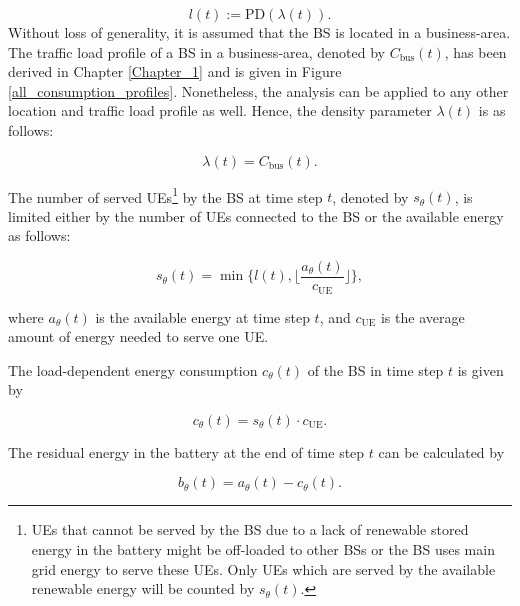 \begin{equation}
\label{PPP1}
l(t):=\mathrm{PD}(\lambda(t)).
\end{equation}
Without loss of generality, it is assumed that the BS is located in a business-area. The traffic load profile of a BS in a business-area, denoted by $C_{\mathrm{bus}}(t)$, has been derived in Chapter \ref{Chapter_1} and is given in Figure \ref{all_consumption_profiles}. Nonetheless, the analysis can be applied to any other location and traffic load profile as well.
 Hence, the density parameter $\lambda(t)$ is as follows:

\begin{equation}
\label{P}
\lambda(t)= C_{\mathrm{bus}}(t).
\end{equation}



The number of served UEs\footnote{UEs that cannot be served by the BS due to a lack of renewable stored energy in the battery might be off-loaded to other BSs or the BS uses main grid energy to serve these UEs. Only UEs which are served by the available renewable energy will be counted by $s_\theta(t)$.} by the BS at time step $t$, denoted by $s_\theta(t)$, is limited either by the number of UEs connected to the BS or the available energy as follows:


\begin{equation}
\label{PPP2}
s_\theta(t)=\min\Big\{l(t),\Big\lfloor \frac{a_\theta(t)}{c_{\mathrm{UE}}}\Big\rfloor\Big\},
\end{equation}



\noindent
where $a_{\theta}(t)$ is the available energy at time step $t$, and $c_{\mathrm{UE}}$ is the average amount of energy needed to serve one UE.

The load-dependent energy consumption $c_\theta(t)$ of the BS in time step $t$ is given by


\begin{equation}
\label{PPP3}
c_\theta(t)=s_\theta(t)\cdot c_{\mathrm{UE}}.
\end{equation}



 The residual energy in the battery at the end of time step $t$ can be calculated by

\begin{equation}
\label{bat}
b_\theta(t)=a_\theta(t)-c_\theta(t).
\end{equation}

